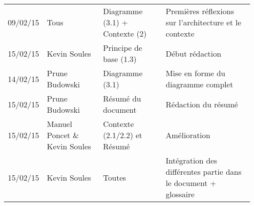 \small
\begin{tabular}{|p{1.5cm}| >{\raggedright}p{2.9cm}| >{\raggedright}p{3.2cm}|p{7.2cm}|}
  \hline
  \rowcolor{Gainsboro} \color{Navy}{\bfseries Date}  & \color{Navy}{\bfseries Auteur} & \color{Navy}{\bfseries Section(s)}  &\color{Navy}{\bfseries Commentaires} \\
  \hline
  09/02/15 & Tous & Diagramme (3.1) + Contexte (2) & Premières réflexions sur l'architecture et le contexte\\
  \hline
  15/02/15 & Kevin Soules & Principe de base (1.3)  & Début rédaction\\
  \hline
  14/02/15 & Prune Budowski & Diagramme (3.1) & Mise en forme du diagramme complet\\
  \hline
  15/02/15 & Prune Budowski & Résumé du document & Rédaction du résumé\\
  \hline
  15/02/15 & Manuel Poncet \& Kevin Soules & Contexte (2.1/2.2) et Résumé & Amélioration\\
  \hline
  15/02/15 & Kevin Soules & Toutes & Intégration des différentes partie dans le document + glossaire\\
  \hline
\end{tabular}
\normalsize
